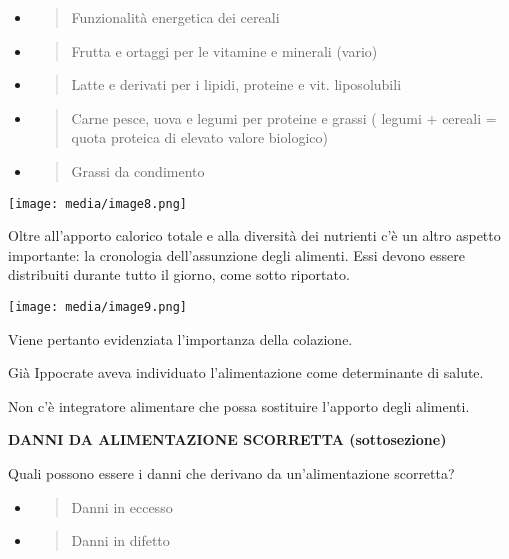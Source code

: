 \documentclass[]{article}
\begin{document}
\begin{itemize}
\item
  \begin{quote}
  Funzionalità energetica dei cereali
  \end{quote}
\item
  \begin{quote}
  Frutta e ortaggi per le vitamine e minerali (vario)
  \end{quote}
\item
  \begin{quote}
  Latte e derivati per i lipidi, proteine e vit. liposolubili
  \end{quote}
\item
  \begin{quote}
  Carne pesce, uova e legumi per proteine e grassi ( legumi + cereali =
  quota proteica di elevato valore biologico)
  \end{quote}
\item
  \begin{quote}
  Grassi da condimento
  \end{quote}
\end{itemize}

\texttt{[image: media/image8.png]}

Oltre all'apporto calorico totale e alla diversità dei nutrienti c'è un
altro aspetto importante: la cronologia dell'assunzione degli alimenti.
Essi devono essere distribuiti durante tutto il giorno, come sotto
riportato.

\texttt{[image: media/image9.png]}

Viene pertanto evidenziata l'importanza della colazione.

Già Ippocrate aveva individuato l'alimentazione come determinante di
salute.

Non c'è integratore alimentare che possa sostituire l'apporto degli
alimenti.

\textbf{DANNI DA ALIMENTAZIONE SCORRETTA (sottosezione)}

Quali possono essere i danni che derivano da un'alimentazione scorretta?

\begin{itemize}
\item
  \begin{quote}
  Danni in eccesso
  \end{quote}
\item
  \begin{quote}
  Danni in difetto
  \end{quote}
\end{itemize}
\end{document}
